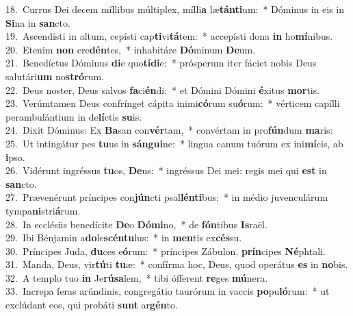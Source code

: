 {18.~}Currus Dei decem míllibus múltiplex, mílli\textbf{a} læ\textbf{tán}\textbf{ti}um:~* Dóminus in eis in \textbf{Si}na in \textbf{san}cto.\\
{19.~}Ascendísti in altum, cepísti cap\textbf{ti}vi\textbf{tá}tem:~* accepísti dona \textbf{in} ho\textbf{mí}nibus.\\
{20.~}Etenim \textbf{non} cre\textbf{dén}tes,~* inhabitáre \textbf{Dó}minum \textbf{De}um.\\
{21.~}Benedíctus Dóminus \textbf{di}e quo\textbf{tí}\textbf{di}e:~* prósperum iter fáciet nobis Deus salutári\textbf{um} no\textbf{stró}rum.\\
{22.~}Deus noster, Deus salvos \textbf{fa}ci\textbf{én}di:~* et Dómini Dómini \textbf{é}xitus \textbf{mor}tis.\\
{23.~}Verúmtamen Deus confrínget cápita inimi\textbf{có}rum su\textbf{ó}rum:~* vérticem capílli perambulántium in de\textbf{lí}ctis \textbf{su}is.\\
{24.~}Dixit Dóminus: Ex \textbf{Ba}san con\textbf{vér}tam,~* convértam in pro\textbf{fún}dum \textbf{ma}ris:\\
{25.~}Ut intingátur pes \textbf{tu}us in \textbf{sán}\textbf{gui}ne:~* lingua canum tuórum ex ini\textbf{mí}cis, ab \textbf{i}pso.\\
{26.~}Vidérunt ingréssus \textbf{tu}os, \textbf{De}us:~* ingréssus Dei mei: regis mei qui \textbf{est} in \textbf{san}cto.\\
{27.~}Prævenérunt príncipes con\textbf{jún}cti psal\textbf{lén}\textbf{ti}bus:~* in médio juvenculárum tympa\textbf{ni}stri\textbf{á}rum.\\
{28.~}In ecclésiis benedícite \textbf{De}o \textbf{Dó}\textbf{mi}no,~* de \textbf{fón}tibus \textbf{Is}raël.\\
{29.~}Ibi Bénjamin a\textbf{do}le\textbf{scén}\textbf{tu}lus:~* in \textbf{men}tis ex\textbf{cés}su.\\
{30.~}Príncipes Juda, \textbf{du}ces e\textbf{ó}rum:~* príncipes Zábulon, \textbf{prín}cipes \textbf{Né}phtali.\\
{31.~}Manda, Deus, vir\textbf{tú}ti \textbf{tu}æ:~* confírma hoc, Deus, quod operátus \textbf{es} in \textbf{no}bis.\\
{32.~}A templo tuo \textbf{in} Je\textbf{rú}\textbf{sa}lem,~* tibi ófferent \textbf{re}ges \textbf{mú}nera.\\
{33.~}Increpa feras arúndinis, congregátio taurórum in vaccis \textbf{po}pu\textbf{ló}rum:~* ut exclúdant eos, qui probáti \textbf{sunt} ar\textbf{gén}to.\\
